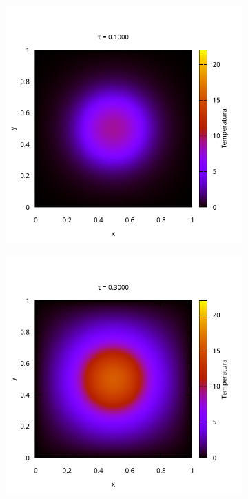 \documentclass[10pt,a4paper]{article}
\theoremstyle{definition}
\theoremstyle{remark}
\begin{document}
\begin{figure}[ht]
  \centering\vspace{-1cm}
  \begin{subfigure}{0.49\linewidth}
    \includegraphics[width=\textwidth]{../plot/Images/heatmap_00010.pdf}
  \end{subfigure}\hfill
  \begin{subfigure}{0.49\linewidth}
    \includegraphics[width=\textwidth]{../plot/Images/heatmap_00030.pdf}

\end{subfigure}
\end{figure}
\end{document}
